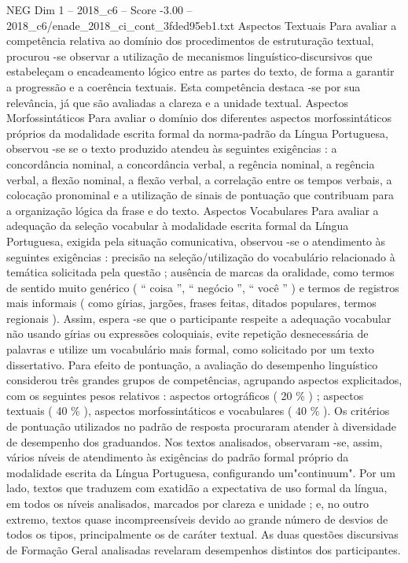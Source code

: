 \begin{textsample}{NEG Dim 1 – 2018\_c6 – Score -3.00 – 2018\_c6/enade\_2018\_ci\_cont\_3fded95eb1.txt}
Aspectos Textuais Para avaliar a competência relativa ao domínio dos procedimentos de estruturação textual, procurou -se observar a utilização de mecanismos linguístico-discursivos que estabeleçam o encadeamento lógico entre as partes do texto, de forma a garantir a progressão e a coerência textuais.
Esta competência destaca -se por sua relevância, já que são avaliadas a clareza e a unidade textual.
Aspectos Morfossintáticos Para avaliar o domínio dos diferentes aspectos morfossintáticos próprios da modalidade escrita formal da norma-padrão da Língua Portuguesa, observou -se se o texto produzido atendeu às seguintes exigências : a concordância nominal, a concordância verbal, a regência nominal, a regência verbal, a flexão nominal, a flexão verbal, a correlação entre os tempos verbais, a colocação pronominal e a utilização de sinais de pontuação que contribuam para a organização lógica da frase e do texto.
Aspectos Vocabulares Para avaliar a adequação da seleção vocabular à modalidade escrita formal da Língua Portuguesa, exigida pela situação comunicativa, observou -se o atendimento às seguintes exigências : precisão na seleção/utilização do vocabulário relacionado à temática solicitada pela questão ; ausência de marcas da oralidade, como termos de sentido muito genérico ( “ coisa ”, “ negócio ”, “ você ” ) e termos de registros mais informais ( como gírias, jargões, frases feitas, ditados populares, termos regionais ).
Assim, espera -se que o participante respeite a adequação vocabular não usando gírias ou expressões coloquiais, evite repetição desnecessária de palavras e utilize um vocabulário mais formal, como solicitado por um texto dissertativo.
Para efeito de pontuação, a avaliação do desempenho linguístico considerou três grandes grupos de competências, agrupando aspectos explicitados, com os seguintes pesos relativos : aspectos ortográficos ( 20 \% ) ; aspectos textuais ( 40 \% ), aspectos morfossintáticos e vocabulares ( 40 \% ).
Os critérios de pontuação utilizados no padrão de resposta procuraram atender à diversidade de desempenho dos graduandos.
Nos textos analisados, observaram -se, assim, vários níveis de atendimento às exigências do padrão formal próprio da modalidade escrita da Língua Portuguesa, configurando um"continuum".
Por um lado, textos que traduzem com exatidão a expectativa de uso formal da língua, em todos os níveis analisados, marcados por clareza e unidade ; e, no outro extremo, textos quase incompreensíveis devido ao grande número de desvios de todos os tipos, principalmente os de caráter textual.
As duas questões discursivas de Formação Geral analisadas revelaram desempenhos distintos dos participantes.

\end{textsample}
